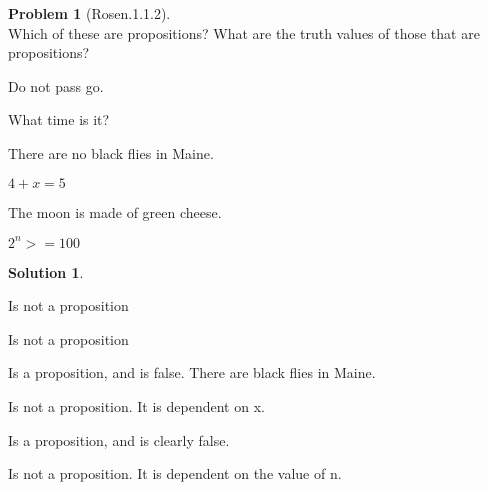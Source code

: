 \documentclass{article}
\theoremstyle{definition}
\newtheorem*{problem}{Problem}
\newtheorem*{solution}{Solution}
\begin{document}
\begin{problem}[Rosen.1.1.2]\ \\
Which of these are propositions? What are the truth values of those that are propositions?
\begin{compactenum}
\renewcommand{\theenumi}{\alph{enumi}}
\item Do not pass go.
\item What time is it?
\item There are no black flies in Maine.
\item $4 + x = 5$
\item The moon is made of green cheese.
\item $2^n >= 100$
\end{compactenum}
\end{problem}

\begin{solution}\ \\
\begin{compactenum}
\renewcommand{\theenumi}{\alph{enumi}}
\item Is not a proposition
\item Is not a proposition
\item Is a proposition, and is false. There are black flies in Maine.
\item Is not a proposition. It is dependent on x.
\item Is a proposition, and is clearly false.
\item Is not a proposition. It is dependent on the value of n.
\end{compactenum}
\end{solution}
\end{document}
